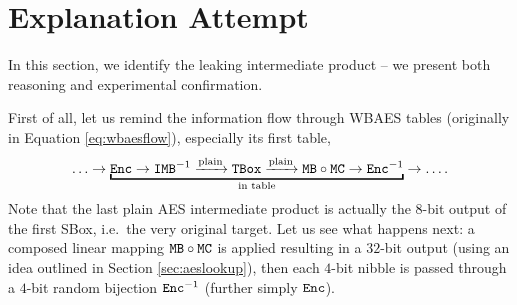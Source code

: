 \section{Explanation Attempt}
\label{sec:attempt}

In this section, we identify the leaking intermediate product -- we present both reasoning and experimental confirmation.

First of all, let us remind the information flow through WBAES tables (originally in Equation \ref{eq:wbaesflow}), especially its first table,
\begin{equation}
\label{eq:wbaesfirst}
	\ldots \rarr \underbracket{\Enc \rarr \IMB^{-1} \xrightarrow{\textnormal{plain}} \TBox \xrightarrow{\textnormal{plain}} \MB \circ \MC \rarr \Enc^{-1}}_{\textnormal{in table}} \rarr \ldots .
\end{equation}
Note that the last plain AES intermediate product is actually the $8$-bit output of the first SBox, i.e.\ the very original target. Let us see what happens next: a composed linear mapping $\texttt{MB}\circ\texttt{MC}$ is applied resulting in a $32$-bit output (using an idea outlined in Section \ref{sec:aeslookup}), then each $4$-bit nibble is passed through a $4$-bit random bijection $\texttt{Enc}^{-1}$ (further simply $\texttt{Enc}$).

